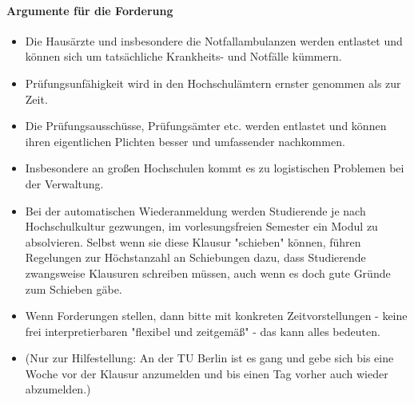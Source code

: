       \paragraph{Argumente für die Forderung}
        \begin{itemize}
          \item Die Hausärzte und insbesondere die Notfallambulanzen werden entlastet und können sich um tatsächliche Krankheits- und Notfälle kümmern.
          \item Prüfungsunfähigkeit wird in den Hochschulämtern ernster genommen als zur Zeit.
          \item Die Prüfungsausschüsse, Prüfungsämter etc. werden entlastet und können ihren eigentlichen Plichten besser und umfassender nachkommen.
          \item Insbesondere an großen Hochschulen kommt es zu logistischen Problemen bei der Verwaltung.
          \item Bei der automatischen Wiederanmeldung werden Studierende je nach Hochschulkultur gezwungen, im vorlesungsfreien Semester ein Modul zu absolvieren. Selbst wenn sie diese Klausur "schieben" können, führen Regelungen zur Höchstanzahl an Schiebungen dazu, dass Studierende zwangsweise Klausuren schreiben müssen, auch wenn es doch gute Gründe zum Schieben gäbe.
          \item Wenn Forderungen stellen, dann bitte mit konkreten Zeitvorstellungen - keine frei interpretierbaren "flexibel und zeitgemäß" - das kann alles bedeuten.
          \item (Nur zur Hilfestellung: An der TU Berlin ist es gang und gebe sich bis eine Woche vor der Klausur anzumelden und bis einen Tag vorher auch wieder abzumelden.)
        \end{itemize}

